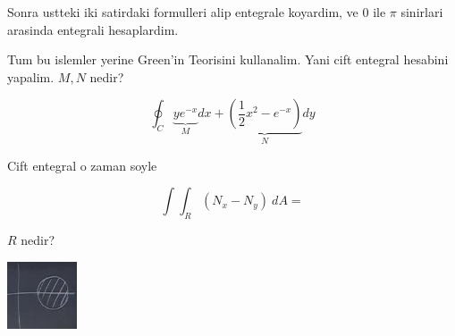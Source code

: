 \documentclass[12pt,fleqn]{article}
\begin{document}
Sonra ustteki iki satirdaki formulleri alip entegrale koyardim, ve 0 ile
$\pi$ sinirlari arasinda entegrali hesaplardim. 

Tum bu islemler yerine Green'in Teorisini kullanalim. Yani cift entegral
hesabini yapalim. $M,N$ nedir? 

\[ \oint_C 
\underbrace{ye^{-x}}_{M} dx + 
\underbrace{(\frac{1}{2}x^2 - e^{-x})}_{N}dy \]

Cift entegral o zaman soyle

\[ \int \int_R (N_x - N_y) \ dA =
\]

$R$ nedir? 

\includegraphics[height=2cm]{22_2.png}





 
\end{document}
